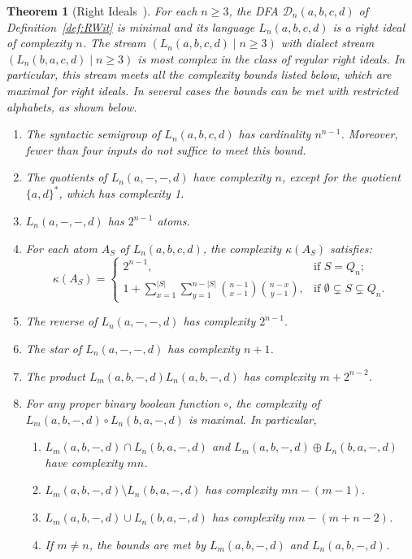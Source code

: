 \documentclass[final]{dmtcs-episciences}
\renewcommand{\ge}{\geqslant}
\newcommand{\emp}{\emptyset}
\newcommand{\be}{\begin{enumerate}}
\newcommand{\ee}{\end{enumerate}}
\newcommand{\cD}{{\mathcal D}}
\newtheorem{theorem}{Theorem}
\theoremstyle{definition}
\theoremstyle{remark}
\begin{document}
\begin{theorem}[Right Ideals~\cite{BrDa14}]
\label{thm:main}
For each $n\ge 3$, the DFA $\cD_n(a,b,c,d)$ of Definition~\ref{def:RWit} is minimal and its 
language $L_n(a,b,c,d)$ is a right ideal of complexity $n$.
The stream $(L_n(a,b,c,d) \mid n \ge 3)$  with dialect stream
$(L_n(b,a,c,d) \mid n \ge 3)$
is most complex in the class of regular right ideals.
In particular, this stream meets all the complexity bounds listed below, which are maximal for right ideals.
In several cases the bounds can be met with restricted alphabets, as shown below.
\begin{enumerate}
\item
The syntactic semigroup of $L_n(a,b,c,d)$ has cardinality $n^{n-1}$.  Moreover, fewer than four inputs do not suffice to meet this bound.
\item
The quotients of $L_n(a,-,-,d)$ have complexity $n$, except for the quotient $\{a,d\}^*$, which has complexity 1.
\item
$L_n(a,-,-,d)$ has $2^{n-1}$ atoms.
\item
For each atom $A_S$ of $L_n(a,b,c,d)$, the complexity $\kappa(A_S)$ satisfies:
\begin{equation*}
	\kappa(A_S) =
	\begin{cases}
		2^{n-1}, 			& \text{if $S=Q_n$;}\\
		1 + \sum_{x=1}^{|S|}\sum_{y=1}^{n-|S|}\binom{n-1}{x-1}\binom{n-x}{y-1},
		 			& \text{if $\emp \subsetneq S \subsetneq Q_n$.}
		\end{cases}
\end{equation*}
\item
The reverse of $L_n(a,-,-,d)$ has complexity $2^{n-1}$.
\item
The star of $L_n(a,-,-,d)$ has complexity $n+1$.
\item
The product $L_m(a,b,-,d) L_n(a,b,-,d)$ has complexity $m+2^{n-2}$.
\item
For any proper binary boolean function $\circ$, the complexity of $L_m(a,b,-,d) \circ L_n(b,a,-,d)$
is maximal. In particular,
	\be
	\item
	$L_m(a,b,-,d) \cap L_n(b,a,-,d)$ and $L_m(a,b,-,d) \oplus 	L_n(b,a,-,d)$ have complexity  $mn$.
	\item
	$L_m(a,b,-,d) \setminus L_n(b,a,-,d)$ has complexity $mn-(m-1)$.
	\item
	$L_m(a,b,-,d) \cup L_n(b,a,-,d)$ has complexity $mn-(m+n-2)$.
	\item 
	If $m\neq n$, the bounds are met by $L_m(a,b,-,d)$ and $ L_n(a,b,-,d)$.
	\ee
\end{enumerate}
\end{theorem}
\end{document}
